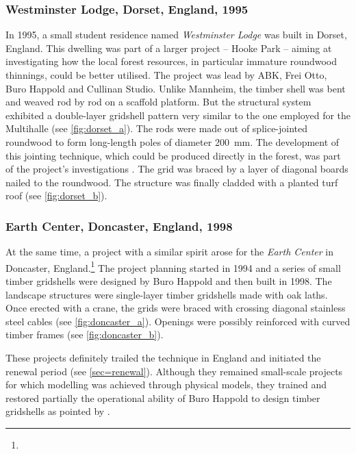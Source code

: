 \subsubsection{Westminster Lodge, Dorset, England, 1995}
In 1995, a small student residence named \emph{Westminster Lodge} was built in Dorset, England. This dwelling was part of a larger project -- Hooke Park -- aiming at investigating how the local forest resources, in particular immature roundwood thinnings, could be better utilised. The project was lead by ABK, Frei Otto, Buro Happold and Cullinan Studio. Unlike Mannheim, the timber shell was bent and weaved rod by rod on a scaffold platform. But the structural system exhibited a double-layer gridshell pattern very similar to the one employed for the Multihalle (see \cref{fig:dorset_a}). The rods were made out of splice-jointed roundwood to form long-length poles of diameter \SI{200}{mm}. The development of this jointing technique, which could be produced directly in the forest, was part of the project's investigations \cite{Burton1998}. The grid was braced by a layer of diagonal boards nailed to the roundwood. The structure was finally cladded with a planted turf roof (see \cref{fig:dorset_b}).


\subsubsection{Earth Center, Doncaster, England, 1998}
At the same time, a project with a similar spirit arose for the \emph{Earth Center} in Doncaster, England.\footnote{} The project planning started in 1994 and a series of small timber gridshells were designed by Buro Happold and then built in 1998. The landscape structures were single-layer timber gridshells made with oak laths. Once erected with a crane, the grids were braced with crossing diagonal stainless steel cables (see \cref{fig:doncaster_a}). Openings were possibly reinforced with curved timber frames (see \cref{fig:doncaster_b}).

These projects definitely trailed the technique in England and initiated the renewal period (see \cref{sec=renewal}). Although they remained small-scale projects for which modelling was achieved through physical models, they trained and restored partially the operational ability of Buro Happold to design timber gridshells as pointed by \citet{Harris2003}.



